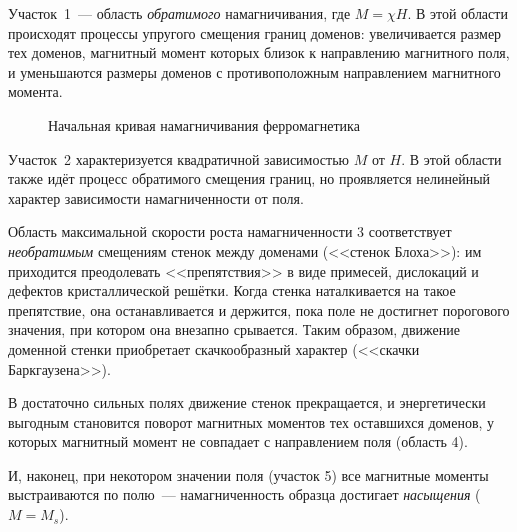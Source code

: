 Участок~1~--- область \emph{обратимого} намагничивания, где $M =\chi H$. В этой области
происходят процессы упругого смещения границ доменов: увеличивается размер тех
доменов, магнитный момент которых близок к направлению магнитного поля, и
уменьшаются размеры доменов с противоположным направлением магнитного момента.

\begin{wrapfigure}[]{r}{0.5\textwidth}
\centering{}
    \caption{Начальная кривая намагничивания ферромагнетика}
\end{wrapfigure}

Участок~2 характеризуется квадратичной зависимостью $M$ от $H$. В этой области
также идёт процесс обратимого смещения границ, но проявляется нелинейный характер
зависимости намагниченности от поля.

Область максимальной скорости роста намагниченности 3 соответствует 
\emph{необратимым} смещениям стенок между доменами (<<стенок Блоха>>):
им приходится преодолевать <<препятствия>> в виде примесей,
дислокаций и дефектов кристаллической решётки.
Когда стенка наталкивается на такое препятствие, она останавливается и держится,
пока поле не достигнет порогового значения, при котором она внезапно
срывается. Таким образом, движение доменной стенки приобретает скачкообразный
характер (<<скачки Баркгаузена>>).


В достаточно сильных полях движение стенок прекращается, и энергетически
выгодным становится поворот магнитных моментов тех оставшихся доменов, у которых
магнитный момент не совпадает с направлением поля (область 4).

И, наконец, при некотором значении поля (участок 5) все магнитные моменты
выстраиваются по полю~--- намагниченность образца достигает 
\emph{насыщения} ($M=M_s$).

